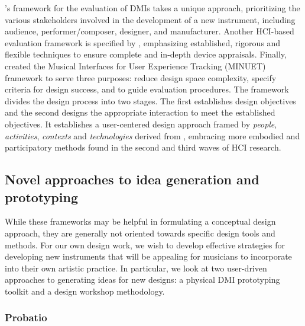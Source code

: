 \documentclass[letterpaper, 12pt]{article}
\begin{document}
\citeauthor{OModhrain2011a}'s framework for the evaluation of DMIs \citep*{OModhrain2011a} takes a unique approach, prioritizing the various stakeholders involved in the development of a new instrument, including audience, performer/composer, designer, and manufacturer. Another HCI-based evaluation framework is specified by \citet{Young2015a}, emphasizing established, rigorous and flexible techniques to ensure complete and in-depth device appraisals. Finally, \citet{fmorreale:2014} created the Musical Interfaces for User Experience Tracking (MINUET) framework to serve three purposes: reduce design space complexity, specify criteria for design success, and to guide evaluation procedures. The framework divides the design process into two stages. The first establishes design objectives and the second designs the appropriate interaction to meet the established objectives. It establishes a user-centered design approach framed by \emph{people}, \emph{activities}, \emph{contexts} and \emph{technologies} derived from \citet{Benyon2005}, embracing more embodied and participatory methods found in the second and third waves of HCI research.

\subsection{Novel approaches to idea generation and prototyping}
\label{ch3-sec:novel-approaches-to-idea-generation-and-prototyping}

While these frameworks may be helpful in formulating a conceptual design approach, they are generally not oriented towards specific design tools and methods. For our own design work, we wish to develop effective strategies for developing new instruments that will be appealing for musicians to incorporate into their own artistic practice. In particular, we look at two user-driven approaches to generating ideas for new designs: a physical DMI prototyping toolkit and a design workshop methodology. 

\subsubsection{Probatio}
\label{ch3-sec:probatio}
\end{document}
